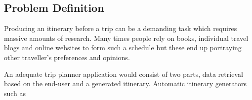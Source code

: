\subsection{Problem Definition}

        Producing an itinerary before a trip can be a demanding task
        which requires massive amounts of research. Many times people
        rely on books, individual travel blogs and online websites to
        form such a schedule but these end up portraying other
        traveller’s preferences and opinions\cite{DeChoudhury2010}.

        An adequate trip planner application would consist of two
        parts, data retrieval based on the end-user and a generated
        itinerary. Automatic itinerary generators such as 
        \cite{DeChoudhury2010,DUNSTALL2008a,DiBitonto2010a,Gavalas
        ,Tumas2009} 
        

        